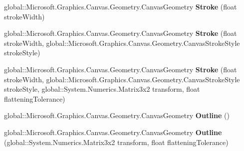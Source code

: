 \begin{DoxyCompactItemize}
\item 
\mbox{\label{class_microsoft_1_1_graphics_1_1_canvas_1_1_geometry_1_1_canvas_geometry_a8af3ce8304eae3ecf06add5210d5b498}} 
global\+::\+Microsoft.\+Graphics.\+Canvas.\+Geometry.\+Canvas\+Geometry {\bfseries Stroke} (float stroke\+Width)
\item 
\mbox{\label{class_microsoft_1_1_graphics_1_1_canvas_1_1_geometry_1_1_canvas_geometry_aa6cb309b9284fbf870333f012b0bdf86}} 
global\+::\+Microsoft.\+Graphics.\+Canvas.\+Geometry.\+Canvas\+Geometry {\bfseries Stroke} (float stroke\+Width, global\+::\+Microsoft.\+Graphics.\+Canvas.\+Geometry.\+Canvas\+Stroke\+Style stroke\+Style)
\item 
\mbox{\label{class_microsoft_1_1_graphics_1_1_canvas_1_1_geometry_1_1_canvas_geometry_acd5ab184e01cc9bd574ccbe0932c0dfd}} 
global\+::\+Microsoft.\+Graphics.\+Canvas.\+Geometry.\+Canvas\+Geometry {\bfseries Stroke} (float stroke\+Width, global\+::\+Microsoft.\+Graphics.\+Canvas.\+Geometry.\+Canvas\+Stroke\+Style stroke\+Style, global\+::\+System.\+Numerics.\+Matrix3x2 transform, float flattening\+Tolerance)
\item 
\mbox{\label{class_microsoft_1_1_graphics_1_1_canvas_1_1_geometry_1_1_canvas_geometry_a2a21e622cb17f94954463d620c8ba650}} 
global\+::\+Microsoft.\+Graphics.\+Canvas.\+Geometry.\+Canvas\+Geometry {\bfseries Outline} ()
\item 
\mbox{\label{class_microsoft_1_1_graphics_1_1_canvas_1_1_geometry_1_1_canvas_geometry_adcb0f78086d81ae4f562717eb38c2207}} 
global\+::\+Microsoft.\+Graphics.\+Canvas.\+Geometry.\+Canvas\+Geometry {\bfseries Outline} (global\+::\+System.\+Numerics.\+Matrix3x2 transform, float flattening\+Tolerance)
\item 
\mbox{\label{class_microsoft_1_1_graphics_1_1_canvas_1_1_geometry_1_1_canvas_geometry_a6b1ed02a2f08b0b00376d6eaca06738f}} 

\end{DoxyCompactItemize}
